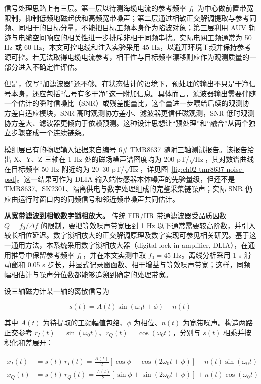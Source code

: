 信号处理思路上有三层。第一层以待测海缆电流的参考频率 \(f_0\) 为中心做前置带宽限制，抑制低频地磁起伏和高频宽带噪声；第二层通过相敏正交解调提取与参考同频、同相干的目标分量，不能把目标工频本身作为陷波对象；第三层利用 AUV 轨迹与电缆空间响应的相关性进一步排斥非相干同频串扰。实际电网工频通常为 50 Hz 或 60 Hz，本文可控电缆和注入实验采用 45 Hz，以避开环境工频并保持参考源可控。若无法取得电缆电流参考，相干性与目标频率漂移则应作为观测质量的一部分进入不确定性评估。

但是，仅写``加滤波器''还不够。在状态估计的语境下，预处理的输出不只是干净信号本身，还应包括``信号有多干净''这一附加信息。具体而言，滤波器输出需要伴随一个估计的瞬时信噪比（SNR）或残差能量比，这个量进一步喂给后续的观测协方差自适应模块，SNR 高时观测协方差小、滤波器更信任磁观测，SNR 低时观测协方差大、滤波器更倾向于依赖预测。这种设计思想让``预处理''和``融合''从两个独立步骤变成一个连续链条。

模组层已有的物理输入证据来自编号 6\# TMR8637 随附三轴测试报告。该报告给出 X、Y、Z 三轴在 1 Hz 处的磁场噪声谱密度均为 200 pT/\(\sqrt{\text{Hz}}\)，其对数谱曲线在目标频率 50 Hz 附近约为 20--30 pT/\(\sqrt{\text{Hz}}\)，详见图~\ref{fig:ch02-tmr8637-noise-psd}。这一结果可作为 DLIA 输入端传感器本体噪声的先验量级，但还不是 TMR8637、SK2301、隔离供电与数字处理组成的完整采集链噪声；实际 SNR 仍应由运行时窗口内的同频信号和邻近频带噪声共同估计。

\textbf{从宽带滤波到相敏数字锁相放大。} 传统 FIR/IIR 带通滤波器受品质因数 \(Q = f_0/\Delta f\) 的限制，要把等效噪声带宽压到 1 Hz 以下通常需要较高阶数，并引入较长相位延迟。数字锁相放大的正交解调原理及数字实现可参见相关研究\cite{song2020dlia}。基于这一通用方法，本系统采用数字锁相放大器（digital lock-in amplifier, DLIA），在通用推导中保留参考频率 \(f_0\)，并在本文实测中取 \(f_0=45\text{ Hz}\)。离线分析采用 1 s 滑动窗和 0.05 s 步长，并显式记录窗函数、相干增益与等效噪声带宽；这样，同频幅相估计与噪声分位数都能够追溯到确定的处理带宽。

设三轴磁力计某一轴的离散信号为

\begin{equation}
s(t) = A(t)\sin(\omega_0 t + \phi) + n(t)
\label{eq:ch03-dlia-signal}
\end{equation}

其中 \(A(t)\) 为待提取的工频幅值包络、\(\phi\) 为相位、\(n(t)\) 为宽带噪声。构造两路正交参考 \(r_I(t) = \sin(\omega_0 t)\)、\(r_Q(t) = \cos(\omega_0 t)\)，分别与 \(s(t)\) 相乘并按积化和差展开：

\begin{equation}
\begin{aligned} x_I(t) &= s(t)\,r_I(t) = \frac{A(t)}{2}\left[\cos\phi - \cos(2\omega_0 t + \phi)\right] + n(t)\sin(\omega_0 t) \\ x_Q(t) &= s(t)\,r_Q(t) = \frac{A(t)}{2}\left[\sin\phi + \sin(2\omega_0 t + \phi)\right] + n(t)\cos(\omega_0 t) \end{aligned}
\label{eq:ch03-dlia-mix}
\end{equation}

